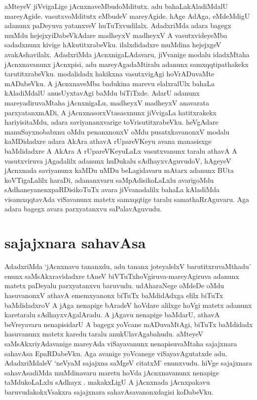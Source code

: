 aMteyeV jiVvigaLige jAcnxnaveMbudoMditutx. adu bahaLakAladiMdalU mareyAgide. vasutxvoMditutx eMbudeV mareyAgide. hAge AdAga, eMdeMdigU adanunx paDeyuva yatanxveV huTuTxvudilalx. AdadxriMda adara bagegx muMdu hejejxyiDabeVkAdare madheyxV madheyxV A vasutxvideyeMba sadadxnunx kivige hAkutitxrabeVku. ilalxdidadxre muMdina hejejxgeV avakAshavilalx. AdadxriMda jAcnxnigaLAdavaru, jiVvanige modalu idadxMtaha jAcnxnavanunx jAcnxpisi, adu mareyAgadaMtiralu adanunx samxqqtipathakekx tarutitxrabeVku. modalidadx hakikxna vasutxvigAgi hoVrADuvaMte mADabeVku. A jAcnxnaveMba badukina marevu elalxralUlx bahaLa kAladiMdalU anusUyxtavAgi baMdu biTiTxde. AdarU adanunx mareyadiruvaMtaha jAcnxnigaLu, madheyxV madheyxV anavarata parxyatanxmADi, A jAcnxnasorxVtasasxnunx jiVvigaLa hatitxrakekx hariyisitaMdu, adara saviyananxvarige toVrisutitxrabeVku. heVgAdare manuSayxnobabxnu oMdu penanxnonxV oMdu pusatxkavanonxV modalu kaMDidadxre adara AkAra athavA rUpareVKeyu avana manasisxge baMdidadxre A AkAra A rUpareVKeyuLaLx vasutxvanunx taralu athavA A vasutxviruva jAgadalilx adanunx huDukalu sAdhayxvAguvudoV, hAgeyeV jAcnxnada saviyanunx kaMDu uMDu beLagidavaru mAtarx adanunx BUta koVTigaLalilx haraDi, adananxvaru saMpAdisikoLaLxlu avarigoMdu sAdhaneyanenxpaRDisikoTuTx avara jiVvanadalilx bahaLa kAladiMda visamxqqtavAda viSavanunx matetx samxqqtige taralu samathaRrAguvaru. Aga adara bagegx avara parxyatanxvu saPalavAguvudu.

\section*{sajajxnara sahavAsa}
  
AdadxriMda `jAcnxnavu tananxdu, adu tananx joteyalelxV barutitxruvaMthadu' enunx saMsAkxravidadxre tAneV biVTuTxhoVgiruva-mareyAgiruva adanunx matetx paDeyalu parxyatanxvu baruvudu. udAharaNege oMdeDe oMdu hasuvanonxV athavA ememxyanonx biTuTx baMdidAdxga elilx biTuTx baMdidadxroV A jAga nenapige bAradeV hoVdare alilxge hoVgi matetx adanunx karetaralu sAdhayxvAgalAradu. A jAgavu nenapige baMdarU, athavA beVreyavaru nenapisidarU A bagegx yoVcane mADuvaMtAgi, biTuTx baMdidadx hasuvanunx matetx karedu taralu anukUlavAgabahudu. aMteyeV saMsAkxriyAdavanige mareyAda viSayavanunx nenapisuvaMtaha sajajxnara sahavAsa EpaRDabeVku. Aga avanige yoVcanege viSayavAgutatxde adu. AdadxriMdaleV `neVyaM sajajxna saMgeV citatxM'\label{83} enunxvudu. hiVge sajajxnara sahavAsadiMda muMdinavaru maretu hoVda jAcnxnavanunx nenapige taMdukoLaLxlu sAdhayx . makakxLigU A jAcnxnada jAcnxpakavu baruvudakokxVsakxra sajajxnara sahavAsavanonxdagisi koDabeVku. 

